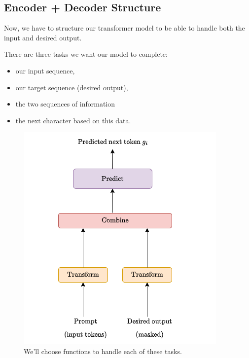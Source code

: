             
            

    \pagebreak

    \subsection{Encoder + Decoder Structure}

        Now, we have to structure our transformer model to be able to handle both the input and desired output.\\

        \begin{concept}
            There are three tasks we want our model to complete:

        \begin{itemize}
            \item {} our input sequence,

            \item {} our target sequence (desired output),

            \item {} the two sequences of information

            \item {} the next character based on this data.
        \end{itemize}

        \end{concept}

        \begin{figure}[H]
            \centering
            \includegraphics[width=0.45\linewidth]{images/transformers_images/encoder_decoder_proto.png}
            \caption*{We'll choose functions to handle each of these tasks.}
        \end{figure}


